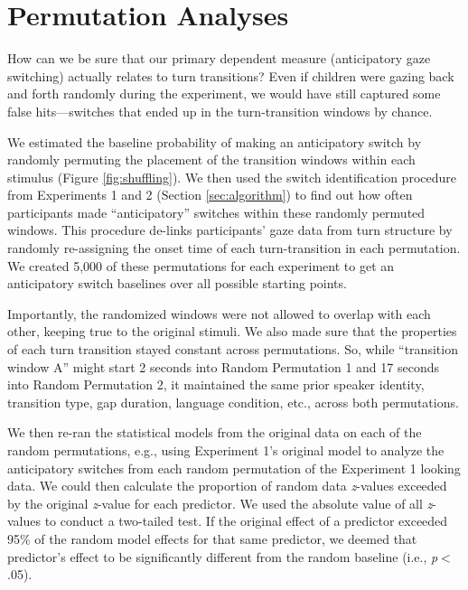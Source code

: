 \documentclass[authoryear, 12pt]{elsarticle}
\begin{document}


\clearpage

\appendix

\section{Permutation Analyses}
\label{sec:permutation}
\setcounter{figure}{0}
\setcounter{table}{0}  
How can we be sure that our primary dependent measure (anticipatory gaze switching) actually relates to turn transitions? Even if children were gazing back and forth randomly during the experiment, we would have still captured some false hits---switches that ended up in the turn-transition windows by chance.

We estimated the baseline probability of making an anticipatory switch by randomly permuting the placement of the transition windows within each stimulus (Figure \ref{fig:shuffling}). We then used the switch identification procedure from Experiments 1 and 2 (Section \ref{sec:algorithm}) to find out how often participants made ``anticipatory'' switches within these randomly permuted windows. This procedure de-links participants' gaze data from turn structure by randomly re-assigning the onset time of each turn-transition in each permutation. We created 5,000 of these permutations for each experiment to get an anticipatory switch baselines over all possible starting points.

Importantly, the randomized windows were not allowed to overlap with each other, keeping true to the original stimuli. We also made sure that the properties of each turn transition stayed constant across permutations. So, while ``transition window A'' might start 2 seconds into Random Permutation 1 and 17 seconds into Random Permutation 2, it maintained the same prior speaker identity, transition type, gap duration, language condition, etc., across both permutations.

We then re-ran the statistical models from the original data on each of the random permutations, e.g., using Experiment 1's original model to analyze the anticipatory switches from each random permutation of the Experiment 1 looking data. We could then calculate the proportion of random data \textit{z}-values exceeded by the original \textit{z}-value for each predictor. We used the absolute value of all \textit{z}-values to conduct a two-tailed test. If the original effect of a predictor exceeded 95\% of the random model effects for that same predictor, we deemed that predictor's effect to be significantly different from the random baseline (i.e., \textit{p}$<$.05).
\end{document}
